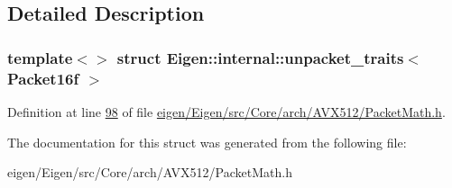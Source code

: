 \subsection{Detailed Description}
\subsubsection*{template$<$$>$\newline
struct Eigen\+::internal\+::unpacket\+\_\+traits$<$ Packet16f $>$}



Definition at line \hyperlink{eigen_2_eigen_2src_2_core_2arch_2_a_v_x512_2_packet_math_8h_source_l00098}{98} of file \hyperlink{eigen_2_eigen_2src_2_core_2arch_2_a_v_x512_2_packet_math_8h_source}{eigen/\+Eigen/src/\+Core/arch/\+A\+V\+X512/\+Packet\+Math.\+h}.



The documentation for this struct was generated from the following file\+:\begin{DoxyCompactItemize}
\item 
eigen/\+Eigen/src/\+Core/arch/\+A\+V\+X512/\+Packet\+Math.\+h\end{DoxyCompactItemize}
